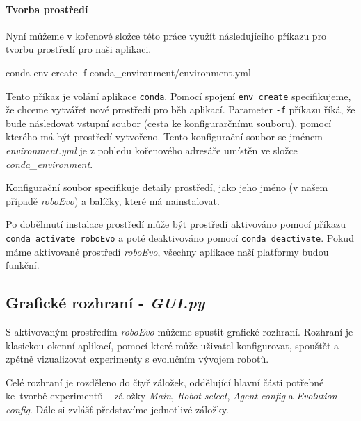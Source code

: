 \paragraph{Tvorba prostředí}
Nyní můžeme v kořenové složce této práce využít následujícího příkazu pro
tvorbu prostředí pro naši aplikaci.
\begin{code}
conda env create -f conda_environment/environment.yml
\end{code}
Tento příkaz je volání aplikace \texttt{conda}. Pomocí spojení \texttt{env
create} specifikujeme, že chceme vytvářet nové prostředí pro běh aplikací.
Parameter \texttt{-f} příkazu říká, že bude následovat vstupní soubor (cesta ke
konfigurarčnímu souboru), pomocí kterého má být prostředí vytvořeno. Tento
konfigurační soubor se jménem \emph{environment.yml} je z pohledu kořenového
adresáře umístěn ve složce \emph{conda\_environment}.

Konfigurační soubor specifikuje detaily prostředí, jako jeho jméno (v našem
případě \emph{roboEvo}) a balíčky, které má nainstalovat.

Po doběhnutí instalace prostředí může být prostředí aktivováno pomocí příkazu
\texttt{conda activate roboEvo} a poté deaktivováno pomocí \texttt{conda
deactivate}. Pokud máme aktivované prostředí \emph{roboEvo}, všechny aplikace
naší platformy budou funkční.

\subsection{Grafické rozhraní - \emph{GUI.py}} \label{doc_12_GUI}

S aktivovaným prostředím \emph{roboEvo} můžeme spustit grafické rozhraní.
Rozhraní je klasickou okenní aplikací, pomocí které může uživatel konfigurovat,
spouštět a zpětně vizualizovat experimenty s evolučním vývojem robotů.

Celé rozhraní je rozděleno do čtyř záložek, oddělující hlavní části potřebné
ke~tvorbě experimentů -- záložky \emph{Main}, \emph{Robot select}, \emph{Agent
config} a \emph{Evolution config}. Dále si zvlášť představíme jednotlivé
záložky.

